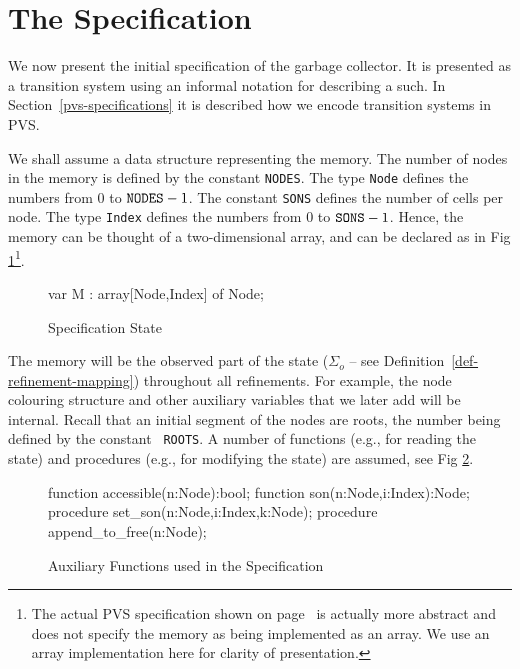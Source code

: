 
\section{The Specification}
\label{goto-specification}

We now present  the initial  specification of  the  garbage
collector.  It is  presented as a  transition  system using an informal
notation for  describing a such.   In Section~\ref{pvs-specifications}
it is described how we encode transition systems in PVS.

We shall assume a data  structure representing the memory.  The number
of  nodes in the  memory is defined by the  constant {\tt NODES}\@.  The
type {\tt Node} defines the numbers from $0$ to ${\tt NODES} - 1$.  The
constant {\tt  SONS} defines the number  of  cells per node.  The type
{\tt Index} defines the numbers  from $0$ to ${\tt  SONS} - 1$. Hence,
the  memory can  be  thought of a   two-dimensional array, and can  be
declared as in Fig \ref{spec-state}\footnote{The actual PVS specification shown on
page~\pageref{memory-fig} is actually more abstract and does not
specify the memory as being implemented as an array.  We use
an array implementation here for clarity of presentation. }.

\begin{figure}[htb]
\begin{smallsession}
  var
    M : array[Node,Index] of Node;
\end{smallsession}
\caption{Specification State}
\label{spec-state}
\end{figure}

The memory will be the observed part  of the state ($\Sigma_{o}$ -- see
Definition~\ref{def-refinement-mapping}) throughout all  refinements. 
For example, the node  colouring  structure and other  auxiliary variables
that we later add will be internal.  Recall that an initial segment of
the  nodes are roots, the  number  being defined by  the constant {\tt
  ROOTS}\@.   A number of functions  (e.g., for reading the  state) and
procedures (e.g., for modifying  the  state) are assumed, see Fig \ref{spec-functions}.

\begin{figure}[htb]
\begin{smallsession}
  function  accessible(n:Node):bool;
  function  son(n:Node,i:Index):Node;
  procedure set_son(n:Node,i:Index,k:Node);
  procedure append_to_free(n:Node);
\end{smallsession}
\caption{Auxiliary Functions used in the Specification}
\label{spec-functions}
\end{figure}

